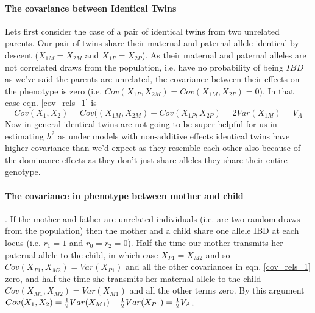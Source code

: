 \paragraph{The covariance between Identical Twins}
Lets first consider the case of a pair of identical twins from two
unrelated parents. Our pair of twins share their maternal and paternal
allele identical by descent ($X_{1M}=X_{2M}$ and $X_{1P}=X_{2P}$). As their maternal and
paternal alleles are not correlated draws from the population,
i.e. have no probability of being $IBD$ as we've said the parents are unrelated, the
covariance between their effects on the phenotype is zero  
(i.e. $Cov(X_{1P},X_{2M})=Cov(X_{1M},X_{2P})=0$). In that case
eqn. \ref{cov_rels_1} is
\begin{equation}
Cov(X_1,X_2) = Cov((X_{1M},X_{2M})+Cov(X_{1P},X_{2P}) = 2Var(X_{1M})
= V_A
\end{equation}
Now in general identical twins are not going to be super helpful for
us in estimating $h^2$ as under models with non-additive effects
identical twins have higher covariance than we'd expect as they
resemble each other also because of the dominance effects as they
don't just share alleles they share their entire genotype.\\

\paragraph{The covariance in phenotype between mother and child}.
If the mother and father are unrelated individuals (i.e. are two
random draws from the population) then the mother and a child share
one allele IBD at each locus (i.e. $r_1=1$ and $r_0=r_2=0$). Half the
time our mother transmits her paternal allele to the child, in which
case $X_{P1}=X_{M2}$ and so $Cov(X_{P1},X_{M2})=Var(X_{P1})$ and all
the other covariances in eqn. \ref{cov_rels_1} zero, and half
the time she transmits her maternal allele to the child
$Cov(X_{M1},X_{M2})=Var(X_{M1})$ and all the other terms zero. By this
argument $Cov(X_1,X_2) = \tfrac{1}{2} Var(X_{M1}) + \tfrac{1}{2} Var(X_{P1}) = \tfrac{1}{2}
V_A$. \\

